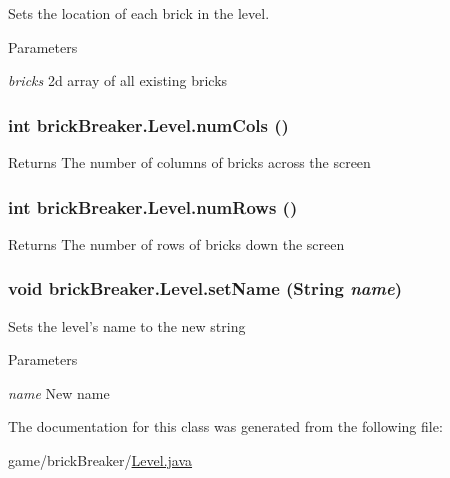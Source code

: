 \label{classbrick_breaker_1_1_level_a2cf993a57ad58665d34d09b9366a39b4}
Sets the location of each brick in the level. 
\begin{DoxyParams}{Parameters}
\item[{\em bricks}]2d array of all existing bricks \end{DoxyParams}
\hypertarget{classbrick_breaker_1_1_level_a3bba82793ace6907c19b5b7d21c9d0c2}{
\subsubsection[{numCols}]{\setlength{\rightskip}{0pt plus 5cm}int brickBreaker.Level.numCols ()}}
\label{classbrick_breaker_1_1_level_a3bba82793ace6907c19b5b7d21c9d0c2}
\begin{DoxyReturn}{Returns}
The number of columns of bricks across the screen 
\end{DoxyReturn}
\hypertarget{classbrick_breaker_1_1_level_a87616f7c125b41d686d6c50477601200}{
\subsubsection[{numRows}]{\setlength{\rightskip}{0pt plus 5cm}int brickBreaker.Level.numRows ()}}
\label{classbrick_breaker_1_1_level_a87616f7c125b41d686d6c50477601200}
\begin{DoxyReturn}{Returns}
The number of rows of bricks down the screen 
\end{DoxyReturn}
\hypertarget{classbrick_breaker_1_1_level_a9658a9bfa4707f92de4891f913377202}{
\subsubsection[{setName}]{\setlength{\rightskip}{0pt plus 5cm}void brickBreaker.Level.setName (String {\em name})}}
\label{classbrick_breaker_1_1_level_a9658a9bfa4707f92de4891f913377202}
Sets the level's name to the new string 
\begin{DoxyParams}{Parameters}
\item[{\em name}]New name \end{DoxyParams}


The documentation for this class was generated from the following file:\begin{DoxyCompactItemize}
\item 
game/brickBreaker/\hyperlink{_level_8java}{Level.java}\end{DoxyCompactItemize}
